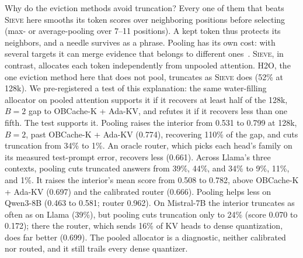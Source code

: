 \documentclass{article}
\newcommand{\sieve}{\textsc{Sieve}}
\theoremstyle{definition}
\begin{document}
Why do the eviction methods avoid truncation?  Every one of them that beats \sieve{} here smooths its token scores over neighboring positions before selecting (max- or average-pooling over 7--11 positions).  A kept token thus protects its neighbors, and a needle survives as a phrase.  Pooling has its own cost: with several targets it can merge evidence that belongs to different ones~\citep{zhang2026fixedcontract}.  \sieve{}, in contrast, allocates each token independently from unpooled attention.  H2O, the one eviction method here that does not pool, truncates as \sieve{} does (52\% at 128k).  We pre-registered a test of this explanation: the same water-filling allocator on pooled attention supports it if it recovers at least half of the 128k, $B=2$ gap to OBCache-K + Ada-KV, and refutes it if it recovers less than one fifth.  The test supports it.  Pooling raises the interior from 0.531 to 0.799 at 128k, $B=2$, past OBCache-K + Ada-KV (0.774), recovering 110\% of the gap, and cuts truncation from 34\% to 1\%.  An oracle router, which picks each head's family on its measured test-prompt error, recovers less (0.661).  Across Llama's three contexts, pooling cuts truncated answers from 39\%, 44\%, and 34\% to 9\%, 11\%, and 1\%.  It raises the interior's mean score from 0.508 to 0.782, above OBCache-K + Ada-KV (0.697) and the calibrated router (0.666).  Pooling helps less on Qwen3-8B (0.463 to 0.581; router 0.962).  On Mistral-7B the interior truncates as often as on Llama (39\%), but pooling cuts truncation only to 24\% (score 0.070 to 0.172); there the router, which sends 16\% of KV heads to dense quantization, does far better (0.699).  The pooled allocator is a diagnostic, neither calibrated nor routed, and it still trails every dense quantizer.
\end{document}
